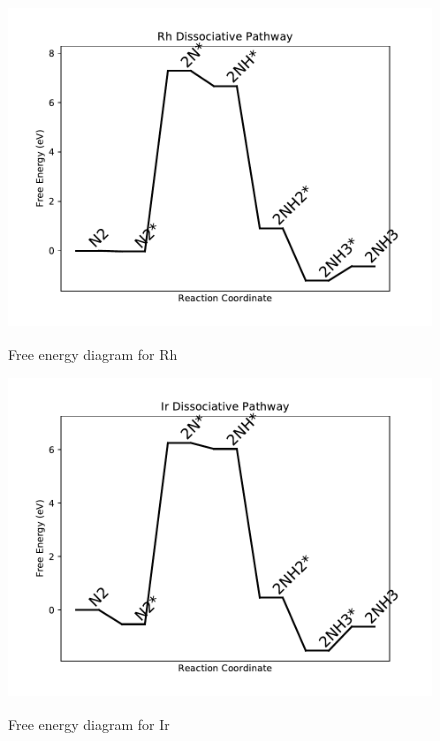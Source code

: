 \documentclass{article}
\begin{document}
\newpage
\begin{figure}
\includegraphics[width=1\linewidth]{data/plots/Rh_dissociative.pdf}
\label{fig:Rh_dissociative}
\caption{Free energy diagram for Rh}
\end{figure}

\begin{figure}
\includegraphics[width=1\linewidth]{data/plots/Ir_dissociative.pdf}
\label{fig:Ir_dissociative}
\caption{Free energy diagram for Ir}
\end{figure}
\end{document}

